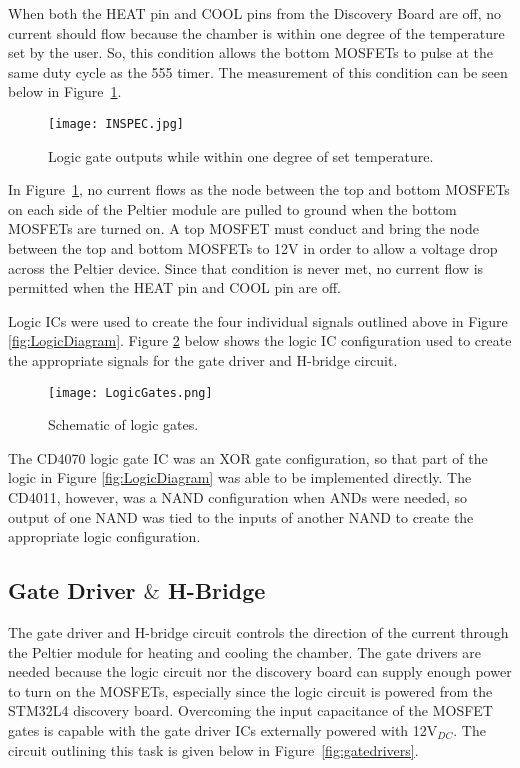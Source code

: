 \documentclass[11pt,letter]{article}
\begin{document}
When both the HEAT pin and COOL pins from the Discovery Board are off, no current should flow because the chamber is within one degree of the temperature set by the user. So, this condition allows the bottom MOSFETs to pulse at the same duty cycle as the 555 timer. The measurement of this condition can be seen below in Figure~\ref{fig:inSpecLogic}.

\begin{figure}[H]
    \centering
    \texttt{[image: INSPEC.jpg]}
    \caption{Logic gate outputs while within one degree of set temperature.}
    \label{fig:inSpecLogic}
\end{figure}
In Figure~\ref{fig:inSpecLogic}, no current flows as the node between the top and bottom MOSFETs on each side of the Peltier module are pulled to ground when the bottom MOSFETs are turned on. A top MOSFET must conduct and bring the node between the top and bottom MOSFETs to 12V in order to allow a voltage drop across the Peltier device. Since that condition is never met, no current flow is permitted when the HEAT pin and COOL pin are off.

Logic ICs were used to create the four individual signals outlined above in Figure \ref{fig:LogicDiagram}. Figure \ref{fig:logic} below shows the logic IC configuration used to create the appropriate signals for the gate driver and H-bridge circuit.

\begin{figure}[H]
    \centering
    \texttt{[image: LogicGates.png]}
    \caption{Schematic of logic gates.}
    \label{fig:logic}
\end{figure}

The CD4070 logic gate IC was an XOR gate configuration, so that part of the logic in Figure \ref{fig:LogicDiagram} was able to be implemented directly. The CD4011, however, was a NAND configuration when ANDs were needed, so output of one NAND was tied to the inputs of another NAND to create the appropriate logic configuration.

\subsection{Gate Driver $\&$ H-Bridge}

The gate driver and H-bridge circuit controls the direction of the current through the Peltier module for heating and cooling the chamber. The gate drivers are needed because the logic circuit nor the discovery board can supply enough power to turn on the MOSFETs, especially since the logic circuit is powered from the STM32L4 discovery board. Overcoming the input capacitance of the MOSFET gates is capable with the gate driver ICs externally powered with 12V$_{DC}$. The circuit outlining this task is given below in Figure~\ref{fig:gatedrivers}.
\end{document}

